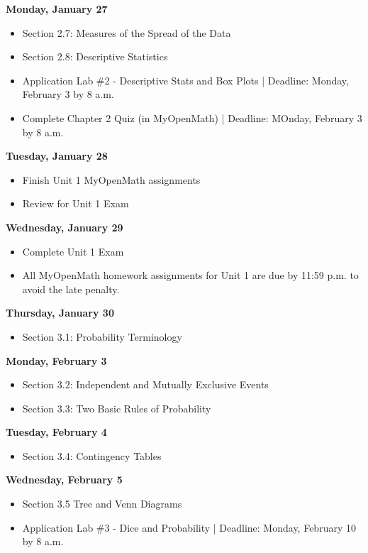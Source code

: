 \documentclass[11pt]{article}
\begin{document}
\textbf{Monday, January 27}

\begin{itemize}
\item Section 2.7: Measures of the Spread of the Data
\item Section 2.8: Descriptive Statistics
\item Application Lab \#2 - Descriptive Stats and Box Plots | Deadline: Monday, February 3 by 8 a.m.
\item Complete Chapter 2 Quiz (in MyOpenMath) | Deadline: MOnday, February 3 by 8 a.m.
\end{itemize}

\textbf{Tuesday, January 28}

\begin{itemize}
\item Finish Unit 1 MyOpenMath assignments
\item Review for Unit 1 Exam
\end{itemize}

\textbf{Wednesday, January 29}

\begin{itemize}
\item Complete Unit 1 Exam
\item All MyOpenMath homework assignments for Unit 1 are due by 11:59 p.m. to avoid the late penalty.
\end{itemize}

\textbf{Thursday, January 30}

\begin{itemize}
\item Section 3.1: Probability Terminology
\end{itemize}

\textbf{Monday, February 3}

\begin{itemize}
\item Section 3.2: Independent and Mutually Exclusive Events
\item Section 3.3: Two Basic Rules of Probability
\end{itemize}

\textbf{Tuesday, February 4}

\begin{itemize}
\item Section 3.4: Contingency Tables
\end{itemize}

\textbf{Wednesday, February 5}

\begin{itemize}
\item Section 3.5 Tree and Venn Diagrams
\item Application Lab \#3 - Dice and Probability | Deadline: Monday, February 10 by 8 a.m.
\end{itemize}
\end{document}
